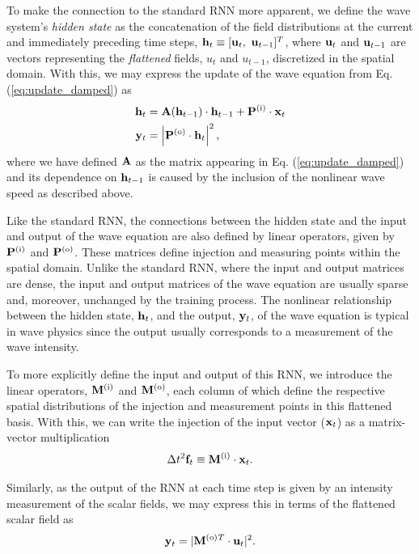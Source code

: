 To make the connection to the standard RNN more apparent, we define the wave system's \textit{hidden state} as the concatenation of the field distributions at the current and immediately preceding time steps, $\mathbf{h}_t \equiv [\mathbf{u}_t,~\mathbf{u}_{t-1}]^T$, where $\mathbf{u}_t$ and $\mathbf{u}_{t-1}$ are vectors representing the \textit{flattened} fields, $u_t$ and $u_{t-1}$, discretized in the spatial domain.  With this, we may express the update of the wave equation from Eq. (\ref{eq:update_damped}) as
%
\begin{align}
\mathbf{h}_t &= \mathbf{A}{\left(\mathbf{h}_{t-1}\right)} \cdot \mathbf{h}_{t-1} + \mathbf{P}^{(\textrm{i})} \cdot \mathbf{x}_t \label{eq:sup_ScalarRNN1}\\
\mathbf{y}_t &= \left\vert \mathbf{P}^{(\textrm{o})} \cdot \mathbf{h}_t \right\vert^2, \label{eq:sup_ScalarRNN2}
\end{align}
where we have defined $\mathbf{A}$ as the matrix appearing in Eq. (\ref{eq:update_damped}) and its  dependence on $\mathbf{h}_{t-1}$ is caused by the inclusion of the nonlinear wave speed as described above.

Like the standard RNN, the connections between the hidden state and the input and output of the wave equation are also defined by linear operators, given by $\mathbf{P}^{(\textrm{i})}$ and $\mathbf{P}^{(\textrm{o})}$. 
These matrices define injection and measuring points within the spatial domain.
Unlike the standard RNN, where the input and output matrices are dense, the input and output matrices of the wave equation are usually sparse and, moreover, unchanged by the training process.
The nonlinear relationship between the hidden state, $\mathbf{h}_t$, and the output, $\mathbf{y}_t$, of the wave equation is typical in wave physics since the output usually corresponds to a measurement of the wave intensity.

To more explicitly define the input and output of this RNN, we introduce the linear operators, $\mathbf{M}^{(\textrm{i})}$ and $\mathbf{M}^{(\textrm{o})}$, each column of which define the respective spatial distributions of the injection and measurement points in this flattened basis.
With this, we can write the injection of the input vector ($\mathbf{x}_t$) as a matrix-vector multiplication
%
\begin{equation}
    \Delta t^2 \mathbf{f}_t \equiv \mathbf{M}^{(\textrm{i})} \cdot \mathbf{x}_t.
\end{equation}

Similarly, as the output of the RNN at each time step is given by an intensity measurement of the scalar fields, we may express this in terms of the flattened scalar field as
\begin{equation}
    \mathbf{y}_t = |\mathbf{M}^{(\textrm{o})}{}^T \cdot \mathbf{u}_t|^2.
\end{equation}


